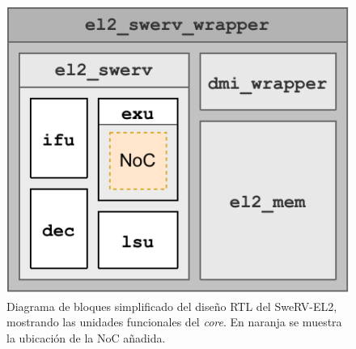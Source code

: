 \begin{figure}[h]
    \centering
    \includegraphics{images/schematics/swerv_blocks.drawio.pdf}
    \caption{Diagrama de bloques simplificado del diseño RTL del SweRV-EL2, mostrando las unidades funcionales del \textit{core}. En naranja se muestra la ubicación de la NoC añadida.}
    \label{fig:swerv_fu}
\end{figure}
